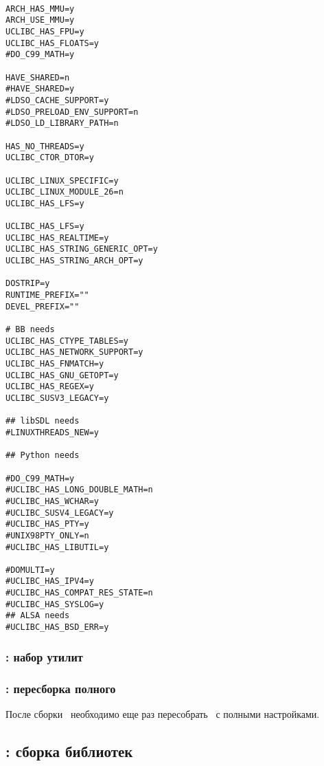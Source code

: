 
\begin{verbatim}

ARCH_HAS_MMU=y
ARCH_USE_MMU=y
UCLIBC_HAS_FPU=y
UCLIBC_HAS_FLOATS=y
#DO_C99_MATH=y

HAVE_SHARED=n
#HAVE_SHARED=y
#LDSO_CACHE_SUPPORT=y
#LDSO_PRELOAD_ENV_SUPPORT=n
#LDSO_LD_LIBRARY_PATH=n

HAS_NO_THREADS=y
UCLIBC_CTOR_DTOR=y

UCLIBC_LINUX_SPECIFIC=y
UCLIBC_LINUX_MODULE_26=n
UCLIBC_HAS_LFS=y

UCLIBC_HAS_LFS=y
UCLIBC_HAS_REALTIME=y
UCLIBC_HAS_STRING_GENERIC_OPT=y
UCLIBC_HAS_STRING_ARCH_OPT=y

DOSTRIP=y
RUNTIME_PREFIX=""
DEVEL_PREFIX=""

# BB needs
UCLIBC_HAS_CTYPE_TABLES=y
UCLIBC_HAS_NETWORK_SUPPORT=y
UCLIBC_HAS_FNMATCH=y
UCLIBC_HAS_GNU_GETOPT=y
UCLIBC_HAS_REGEX=y
UCLIBC_SUSV3_LEGACY=y

## libSDL needs
#LINUXTHREADS_NEW=y

## Python needs

#DO_C99_MATH=y
#UCLIBC_HAS_LONG_DOUBLE_MATH=n
#UCLIBC_HAS_WCHAR=y
#UCLIBC_SUSV4_LEGACY=y
#UCLIBC_HAS_PTY=y
#UNIX98PTY_ONLY=n
#UCLIBC_HAS_LIBUTIL=y

#DOMULTI=y
#UCLIBC_HAS_IPV4=y
#UCLIBC_HAS_COMPAT_RES_STATE=n
#UCLIBC_HAS_SYSLOG=y
## ALSA needs
#UCLIBC_HAS_BSD_ERR=y

\end{verbatim}



\subsubsection{: набор утилит } \label{azbb}

\subsubsection{: пересборка полного } \label{azgcc}

После сборки \ необходимо еще раз пересобрать \ с полными
настройками.

\subsection{: сборка библиотек } \label{azlibs}

